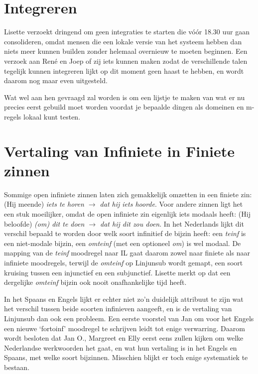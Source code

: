 \section{Integreren}
Lisette verzoekt dringend om geen integraties te starten die v\'{o}\'{o}r 18.30
uur gaan consolideren, omdat mensen die een lokale versie van het systeem hebben
dan niets meer kunnen builden zonder helemaal overnieuw te moeten beginnen.
Een verzoek aan Ren\'{e} en Joep of zij iets kunnen maken zodat de verschillende
talen tegelijk kunnen integreren lijkt op dit moment geen haast te hebben, 
en wordt daarom nog maar even uitgesteld.

Wat wel aan hen gevraagd zal worden is om een lijstje te maken van wat er nu
precies eerst gebuild moet worden voordat je bepaalde dingen als domeinen en 
m-regels lokaal kunt testen.

\section{Vertaling van Infiniete in Finiete zinnen}
Sommige open infiniete zinnen laten zich gemakkelijk omzetten in een finiete 
zin: 
(Hij meende) {\em iets te horen $\rightarrow$ dat hij iets hoorde\/}. Voor 
andere zinnen ligt het een stuk moeilijker, omdat de open infiniete
zin eigenlijk iets modaals heeft: (Hij beloofde) {\em (om) dit te doen
$\rightarrow$ dat hij dit {\em zou} doen\/}. In het Nederlands lijkt dit
verschil bepaald te worden door welk soort infinitief de bijzin heeft:
een {\em teinf\/} is een niet-modale bij\-zin, een {\em 
omteinf\/} (met een optioneel {\em om\/}) is wel modaal. De mapping van de
{\em teinf\/} moodregel naar IL gaat daarom zowel naar finiete als naar 
infiniete moodregels, terwijl de {\em omteinf\/} op Linjunsub wordt gemapt,
een soort kruising tussen een injunctief en een subjunctief. Lisette merkt op
dat een dergelijke {\em omteinf\/} bijzin ook nooit onafhankelijke tijd heeft.

In het Spaans en Engels lijkt er echter niet zo'n duidelijk attribuut te zijn 
wat het verschil tussen beide soorten infinieven aangeeft, en is de vertaling 
van Linjunsub dan ook een probleem. Een eerste voorstel van Jan om voor het
Engels een nieuwe `fortoinf' moodregel te schrijven leidt tot enige verwarring.
Daarom wordt besloten dat Jan O., Margreet en Elly eerst eens zullen kijken
om welke Nederlandse werkwoorden het gaat, en wat hun vertaling is in het 
Engels en Spaans, met welke soort bijzinnen. Misschien blijkt er toch enige
systematiek te bestaan.

